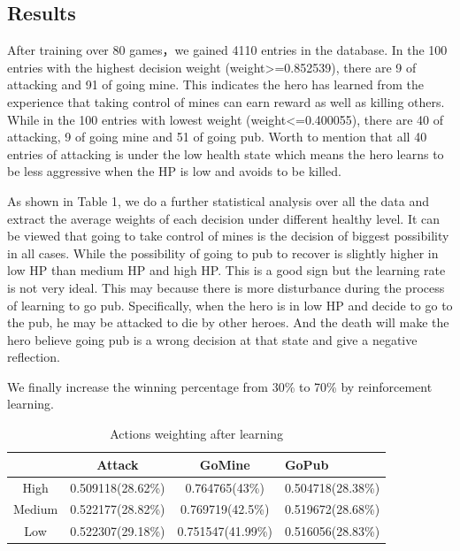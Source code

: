 \subsection{Results}
After training over 80 games，we gained 4110 entries in the database. In the 100 entries with the highest decision weight (weight>=0.852539), there are 9 of attacking and 91 of going mine. This indicates the hero has learned from the experience that taking control of mines can earn reward as well as killing others. While in the 100 entries with lowest weight (weight<=0.400055), there are 40 of attacking, 9 of going mine and 51 of going pub. Worth to mention that all 40 entries of attacking is under the low health state which means the hero learns to be less aggressive when the HP is low and avoids to be killed.

As shown in Table 1, we do a further statistical analysis over all the data and extract the average weights of each decision under different healthy level. It can be viewed that going to take control of mines is the decision of biggest possibility in all cases. While the possibility of going to pub to recover is slightly higher in low HP than medium HP and high HP. This is a good sign but the learning rate is not very ideal. This may because there is more disturbance during the process of learning to go pub. Specifically, when the hero is in low HP and decide to go to the pub, he may be attacked to die by other heroes. And the death will make the hero believe going pub is a wrong decision at that state and give a negative reflection.

We finally increase the winning percentage from 30\% to 70\% by reinforcement learning.

\begin{table}
 \caption{Actions weighting after learning}
 \label{tab:commands}
 \begin{tabular}{cccl}
   \toprule
   	  & Attack & GoMine &  GoPub\\
   \midrule
   High & 0.509118(28.62\%) & 0.764765(43\%)& 0.504718(28.38\%)\\
   Medium & 0.522177(28.82\%) & 0.769719(42.5\%)&
   0.519672(28.68\%)\\
   Low &0.522307(29.18\%) & 0.751547(41.99\%) & 0.516056(28.83\%)\\
   \bottomrule
 \end{tabular}
\end{table}




